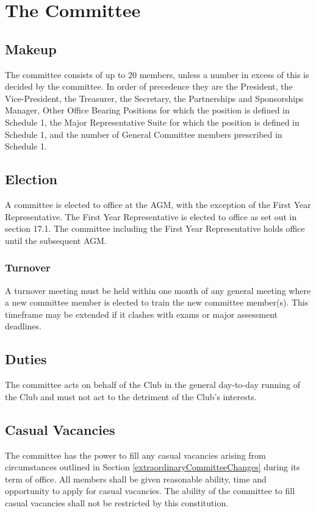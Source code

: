 \documentclass[11pt]{article}
\begin{document}
\section{The Committee} \label{theCommittee}
\subsection{Makeup} \label{committeeMakeup}
The committee consists of up to 20 members, unless a number in excess of this is decided by the committee. In order of precedence they are the President, the Vice-President, the Treasurer, the Secretary, the Partnerships and Sponsorships Manager, Other Office Bearing Positions for which the position is defined in Schedule 1, the Major Representative Suite for which the position is defined in Schedule 1, and the number of General Committee members prescribed in Schedule 1.

\subsection{Election}
A committee is elected to office at the AGM, with the exception of the First Year Representative. The First Year Representative is elected to office as set out in section 17.1. The committee including the First Year Representative holds office until the subsequent AGM.
\subsubsection{Turnover}
A turnover meeting must be held within one month of any general meeting where a new committee member is elected to train the new committee member(s). This timeframe may be extended if it clashes with exams or major assessment deadlines.

\subsection{Duties}
The committee acts on behalf of the Club in the general day-to-day running of the Club and must not act to the detriment of the Club’s interests.

\subsection{Casual Vacancies} \label{committeeCasualVacancies}
The committee has the power to fill any casual vacancies arising from circumstances outlined in Section \ref{extraordinaryCommitteeChanges} during its term of office. All members shall be given reasonable ability, time and opportunity to apply for casual vacancies. The ability of the committee to fill casual vacancies shall not be restricted by this constitution.
\end{document}
